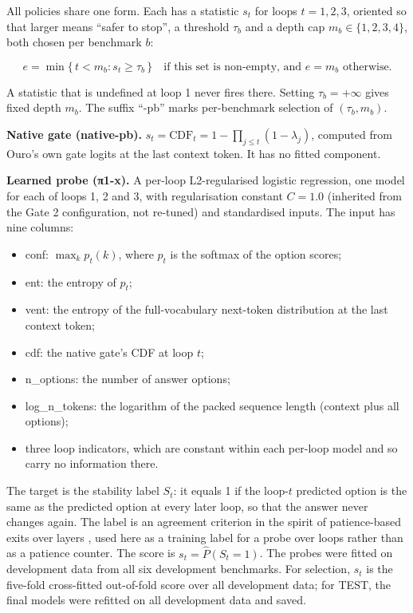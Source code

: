 All policies share one form. Each has a statistic \(s_t\) for loops \(t = 1,2,3\), oriented so that larger means ``safer to stop'', a threshold \(\tau_b\) and a depth cap \(m_b \in \{1,2,3,4\}\), both chosen per benchmark \(b\):

\[e = \min\{\, t < m_b : s_t \ge \tau_b \,\} \quad \text{if this set is non-empty, and } e = m_b \text{ otherwise.}\]

A statistic that is undefined at loop 1 never fires there. Setting \(\tau_b = +\infty\) gives fixed depth \(m_b\). The suffix ``-pb'' marks per-benchmark selection of \((\tau_b, m_b)\).

\textbf{Native gate (native-pb).} \(s_t = \text{CDF}_t = 1 - \prod_{j \le t}(1-\lambda_j)\), computed from Ouro's own gate logits at the last context token. It has no fitted component.

\textbf{Learned probe (π1-x).} A per-loop L2-regularised logistic regression, one model for each of loops 1, 2 and 3, with regularisation constant \(C = 1.0\) (inherited from the Gate 2 configuration, not re-tuned) and standardised inputs. The input has nine columns:

\begin{itemize}
\tightlist
\item
  conf: \(\max_k p_t(k)\), where \(p_t\) is the softmax of the option scores;
\item
  ent: the entropy of \(p_t\);
\item
  vent: the entropy of the full-vocabulary next-token distribution at the last context token;
\item
  cdf: the native gate's CDF at loop \(t\);
\item
  n\_options: the number of answer options;
\item
  log\_n\_tokens: the logarithm of the packed sequence length (context plus all options);
\item
  three loop indicators, which are constant within each per-loop model and so carry no information there.
\end{itemize}

The target is the stability label \(S_t\): it equals 1 if the loop-\(t\) predicted option is the same as the predicted option at every later loop, so that the answer never changes again. The label is an agreement criterion in the spirit of patience-based exits over layers \citep{Zhou2020}, used here as a training label for a probe over loops rather than as a patience counter. The score is \(s_t = \hat{P}(S_t = 1)\). The probes were fitted on development data from all six development benchmarks. For selection, \(s_t\) is the five-fold cross-fitted out-of-fold score over all development data; for TEST, the final models were refitted on all development data and saved.

